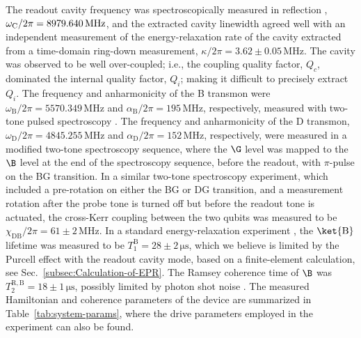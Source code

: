 The readout cavity frequency was spectroscopically measured in reflection
\citep{Geerlings2013}, $\omega_{\mathrm{C}}/2\pi=8979.640\text{\,MHz}$,
and the extracted cavity linewidth agreed well with an independent
measurement of the energy-relaxation rate of the cavity extracted
from a time-domain ring-down measurement, $\kappa/2\pi=3.62\pm0.05\,\mathrm{MHz}.$
The cavity was observed to be well over-coupled; i.e., the coupling
quality factor, $Q_{c}$, dominated the internal quality factor, $Q_{i}$;
making it difficult to precisely extract $Q_{i}.$ The frequency and
anharmonicity of the B transmon were $\omega_{\mathrm{B}}/2\pi=5570.349\,\mathrm{MHz}$
and $\alpha_{\mathrm{B}}/2\pi=195\,\mathrm{MHz}$, respectively, measured
with two-tone pulsed spectroscopy \citep{Geerlings2013,Reagor2016}.
The frequency and anharmonicity of the D transmon, $\omega_{\mathrm{D}}/2\pi=4845.255\,\mathrm{MHz}$
and $\alpha_{\mathrm{D}}/2\pi=152\,\mathrm{MHz}$, respectively, were
measured in a modified two-tone spectroscopy sequence, where the $\G$
level was mapped to the $\B$ level at the end of the spectroscopy
sequence, before the readout, with $\pi$-pulse on the BG transition.
In a similar two-tone spectroscopy experiment, which included a pre-rotation
on either the BG or DG transition, and a measurement rotation after
the probe tone is turned off but before the readout tone is actuated,
the cross-Kerr coupling between the two qubits was measured to be
$\chi_{\mathrm{DB}}/2\pi=61\pm2\,\mathrm{MHz}$. In a standard energy-relaxation
experiment \citep{Geerlings2013}, the $\ket{\mathrm{B}}$ lifetime
was measured to be $T_{\mathrm{1}}^{\mathrm{B}}=28\pm2\,\mathrm{\mu s}$,
which we believe is limited by the Purcell effect with the readout
cavity mode, based on a finite-element calculation, see Sec.~\ref{subsec:Calculation-of-EPR}.
The Ramsey coherence time of $\B$ was $T_{\mathrm{2}}^{\mathrm{R,B}}=18\pm1\,\mathrm{\mu s}$,
possibly limited by photon shot noise \citep{Gambetta2006-dephasing,Rigetti2012}.
The measured Hamiltonian and coherence parameters of the device are
summarized in Table~\ref{tab:system-params}, where the drive parameters
employed in the experiment can also be found. 

